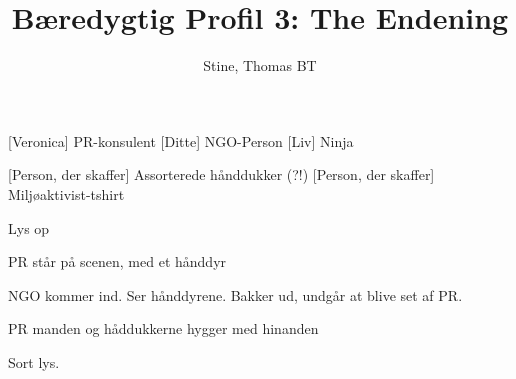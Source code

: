\documentclass[a4paper,11pt]{article}
\title{Bæredygtig Profil 3: The Endening}
\author{Stine, Thomas BT}
\begin{document}
\maketitle

\begin{roles}
    [Veronica] PR-konsulent
    [Ditte] NGO-Person
    [Liv] Ninja
\end{roles}

\begin{props}
    [Person, der skaffer] Assorterede hånddukker (?!)
    [Person, der skaffer] Miljøaktivist-tshirt
\end{props}


\begin{sketch}

\begin{center}

\end{center}


\scene Lys op


\scene PR står på scenen, med et hånddyr


\scene NGO kommer ind. Ser hånddyrene. Bakker ud, undgår at blive set af PR. 


\scene PR manden og håddukkerne hygger med hinanden


\scene Sort lys. 


\end{sketch}
\end{document}

